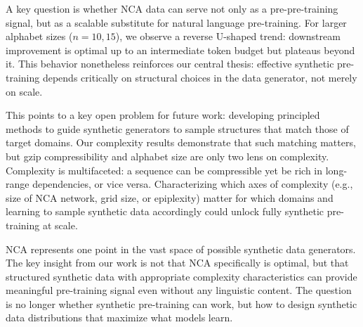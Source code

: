 \documentclass{article}
\newcommand{\dl}[1]{\textcolor{violet}{DL: #1}}
\theoremstyle{plain}
\theoremstyle{definition}
\theoremstyle{remark}
\begin{document}
A key question is whether NCA data can serve not only as a pre-pre-training signal, but as a scalable substitute for natural language pre-training. For larger alphabet sizes ($n=10,15$), we observe a reverse U-shaped trend: downstream improvement is optimal up to an intermediate token budget but plateaus beyond it. This behavior nonetheless reinforces our central thesis: effective synthetic pre-training depends critically on structural choices in the data generator, not merely on scale. 



This points to a key open problem for future work: developing principled methods to guide synthetic generators to sample structures that match those of target domains. Our complexity results demonstrate that such matching matters, but gzip compressibility and alphabet size are only two lens on complexity. Complexity is multifaceted: a sequence can be compressible yet be rich in long-range dependencies, or vice versa. Characterizing which axes of complexity (e.g., size of NCA network, grid size, or epiplexity) matter for which domains and learning to sample synthetic data accordingly could unlock fully synthetic pre-training at scale.

NCA represents one point in the vast space of possible synthetic data generators. The key insight from our work is not that NCA specifically is optimal, but that structured synthetic data with appropriate complexity characteristics can provide meaningful pre-training signal even without any linguistic content. The question is no longer whether synthetic pre-training can work, but how to design synthetic data distributions that maximize what models learn.

\end{document}

